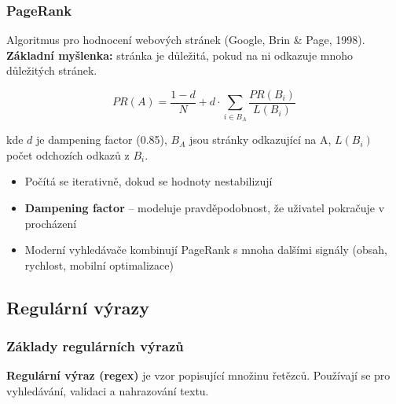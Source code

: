 \subsubsection{PageRank}

Algoritmus pro hodnocení webových stránek (Google, Brin \& Page, 1998).
\textbf{Základní myšlenka:} stránka je důležitá, pokud na ni odkazuje mnoho důležitých stránek.

$$PR(A) = \frac{1-d}{N} + d \cdot \sum_{i \in B_A} \frac{PR(B_i)}{L(B_i)}$$

kde $d$ je dampening factor (0.85), $B_A$ jsou stránky odkazující na A, $L(B_i)$ počet odchozích odkazů z $B_i$.

\begin{itemize}
  \item Počítá se iterativně, dokud se hodnoty nestabilizují
  \item \textbf{Dampening factor} -- modeluje pravděpodobnost, že uživatel pokračuje v procházení
  \item Moderní vyhledávače kombinují PageRank s mnoha dalšími signály (obsah, rychlost, mobilní optimalizace)
\end{itemize}

\subsection{Regulární výrazy}

\subsubsection{Základy regulárních výrazů}

\textbf{Regulární výraz (regex)} je vzor popisující množinu řetězců. Používají se pro vyhledávání,
validaci a nahrazování textu.


